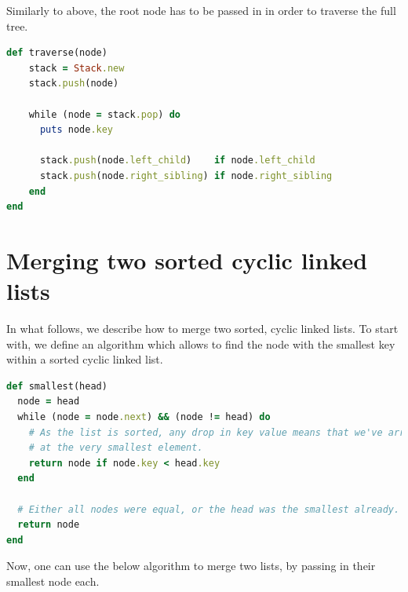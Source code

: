 \documentclass[a4paper]{scrartcl}
\begin{document}
Similarly to above, the root node has to be passed in in order to traverse the
full tree.

\begin{lstlisting}[language=ruby]
def traverse(node)
    stack = Stack.new
    stack.push(node)

    while (node = stack.pop) do
      puts node.key

      stack.push(node.left_child)    if node.left_child
      stack.push(node.right_sibling) if node.right_sibling
    end
end
\end{lstlisting}

\section{Merging two sorted cyclic linked lists}

In what follows, we describe how to merge two sorted, cyclic linked lists. To
start with, we define an algorithm which allows to find the node with the
smallest key within a sorted cyclic linked list.

\begin{lstlisting}[language=ruby]
def smallest(head)
  node = head
  while (node = node.next) && (node != head) do
    # As the list is sorted, any drop in key value means that we've arrived
    # at the very smallest element.
    return node if node.key < head.key
  end

  # Either all nodes were equal, or the head was the smallest already.
  return node
end
\end{lstlisting}

Now, one can use the below algorithm to merge two lists, by passing in their
smallest node each.
\end{document}
